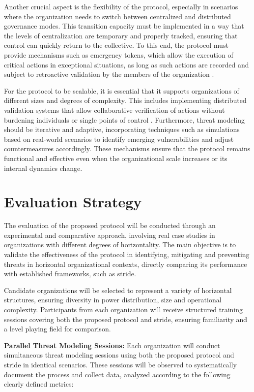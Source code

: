 Another crucial aspect is the flexibility of the protocol, especially in
scenarios where the organization needs to switch between centralized and
distributed governance modes. This transition capacity must be implemented in a
way that the levels of centralization are temporary and properly tracked,
ensuring that control can quickly return to the collective. To this end, the
protocol must provide mechanisms such as emergency tokens, which allow the
execution of critical actions in exceptional situations, as long as such actions
are recorded and subject to retroactive validation by the members of the
organization \cite{Colbac}.

For the protocol to be scalable, it is essential that it supports organizations
of different sizes and degrees of complexity. This includes implementing
distributed validation systems that allow collaborative verification of actions
without burdening individuals or single points of control \cite{Colbac}.
Furthermore, threat modeling should be iterative and adaptive, incorporating
techniques such as simulations based on real-world scenarios to identify
emerging vulnerabilities and adjust countermeasures accordingly. These
mechanisms ensure that the protocol remains functional and effective even when
the organizational scale increases or its internal dynamics change.

\section{Evaluation Strategy}
\label{sec:evaluation_strategy}

The evaluation of the proposed protocol will be conducted through an
experimental and comparative approach, involving real case studies in
organizations with different degrees of horizontality. The main objective is to
validate the effectiveness of the protocol in identifying, mitigating and
preventing threats in horizontal organizational contexts, directly comparing its
performance with established frameworks, such as \gls{stride}.

Candidate organizations will be selected to represent a variety of horizontal
structures, ensuring diversity in power distribution, size and operational
complexity. Participants from each organization will receive structured training
sessions covering both the proposed protocol and \gls{stride}, ensuring
familiarity and a level playing field for comparison.

\textbf{Parallel Threat Modeling Sessions:}
Each organization will conduct simultaneous threat modeling sessions using both
the proposed protocol and \gls{stride} in identical scenarios. These sessions
will be observed to systematically document the process and collect data,
analyzed according to the following clearly defined metrics:

